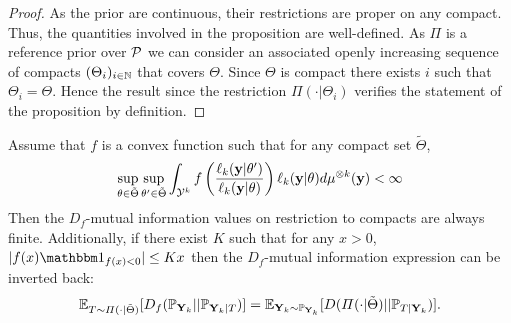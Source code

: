 \begin{proof}
    As the prior are continuous, their restrictions are proper on any compact. Thus, the quantities involved in the proposition are well-defined. 
    As $\varPi$ is a reference prior over $\mathcal{P}$ we can consider an associated openly increasing sequence of compacts $(\Theta_i)_{i\in\mathbb{N}}$ that covers $\Theta$. Since $\Theta$ is compact there exists $i$ such that $\Theta_i=\Theta$. Hence the result since the restriction $\varPi(\cdot|\Theta_i)$ verifies the statement of the proposition by definition.
\end{proof}

\begin{prop}[Invertibility]
    Assume that $f$ is a convex function such that %
    for any compact set $\tilde\Theta$,
        \begin{equation}
            \sup_{\theta\in\tilde\Theta}\sup_{\theta'\in\tilde\Theta} \int_{\mathcal{Y}^k} f\left(\frac{\ell_k(\mathbf{y}|\theta')}{\ell_k(\mathbf{y}|\theta)}  \right) \ell_k(\mathbf{y}|\theta) d\mu^{\otimes k}(\mathbf{y})<\infty
        \end{equation}
    Then the $D_f$-mutual information values on restriction to compacts are always finite. Additionally, if there exist $K$ such that for any $x>0$, $|f(x)\indic_{f(x)<0}|\leq Kx $ then the $D_f$-mutual information expression can be inverted back:
        \begin{equation}
            \mathbb{E}_{T\sim\varPi(\cdot|\tilde\Theta)}[D_f(\mathbb{P}_{\mathbf{Y}_k}||\mathbb{P}_{\mathbf{Y}_k|T})] 
                =\mathbb{E}_{\mathbf{Y}_k\sim\mathbb{P}_{\mathbf{Y}_k}} [D(\varPi(\cdot|\tilde\Theta)|| \mathbb{P}_{T|\mathbf{Y}_k} ) ]. 
        \end{equation}
\end{prop}

